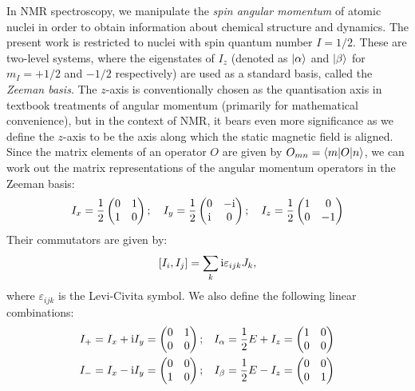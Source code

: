 In NMR spectroscopy, we manipulate the \textit{spin angular momentum} of atomic nuclei in order to obtain information about chemical structure and dynamics.
The present work is restricted to nuclei with spin quantum number $I = 1/2$.
These are two-level systems, where the eigenstates of $I_z$ (denoted as $\ket{\alpha}$ and $\ket{\beta}$ for $m_I = +1/2$ and $-1/2$ respectively) are used as a standard basis, called the \textit{Zeeman basis}.
The $z$-axis is conventionally chosen as the quantisation axis in textbook treatments of angular momentum (primarily for mathematical convenience), but in the context of NMR, it bears even more significance as we define the $z$-axis to be the axis along which the static magnetic field is aligned.
Since the matrix elements of an operator $O$ are given by $O_{mn} = \braket{m|O|n}$, we can work out the matrix representations of the angular momentum operators in the Zeeman basis:
\begin{equation}
    \label{eq:pauli}
    I_x = \frac{1}{2}\begin{pmatrix} 0 & 1 \\ 1 & 0 \end{pmatrix}; \quad 
    I_y = \frac{1}{2}\begin{pmatrix} 0 & -\mathrm{i} \\ \mathrm{i} & 0 \end{pmatrix}; \quad 
    I_z = \frac{1}{2}\begin{pmatrix} 1 & 0 \\ 0 & -1 \end{pmatrix}
\end{equation}
Their commutators are given by:
\begin{equation}
    \label{eq:angmom_commutators}
    [I_i, I_j] = \sum_{k} \mathrm{i} \varepsilon_{ijk}J_k,
\end{equation}
where $\varepsilon_{ijk}$ is the Levi-Civita symbol.
We also define the following linear combinations:
\begin{equation}
    \label{eq:other_single_spin_ops}
    \begin{aligned}
        I_+ = I_x + \mathrm{i} I_y &= \begin{pmatrix} 0 & 1 \\ 0 & 0 \end{pmatrix}; &
        I_\alpha = \frac{1}{2}E + I_z &= \begin{pmatrix} 1 & 0 \\ 0 & 0 \end{pmatrix} \\
        I_- = I_x - \mathrm{i} I_y &= \begin{pmatrix} 0 & 0 \\ 1 & 0 \end{pmatrix}; &
        I_\beta = \frac{1}{2}E - I_z &= \begin{pmatrix} 0 & 0 \\ 0 & 1 \end{pmatrix}
    \end{aligned}
\end{equation}

